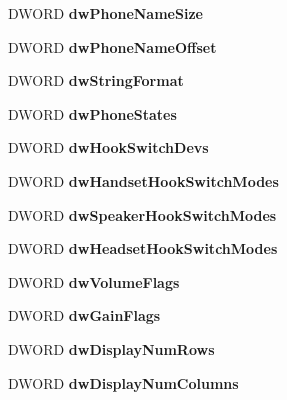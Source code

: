 \begin{DoxyCompactItemize}
D\+W\+O\+RD {\bfseries dw\+Phone\+Name\+Size}
\item 
\mbox{\label{structphonecaps__tag_a3098e0c892d12db66396d76dcca60234}} 
D\+W\+O\+RD {\bfseries dw\+Phone\+Name\+Offset}
\item 
\mbox{\label{structphonecaps__tag_ab76e653cf44c86c24b37ab6d427f272c}} 
D\+W\+O\+RD {\bfseries dw\+String\+Format}
\item 
\mbox{\label{structphonecaps__tag_aebfd889127f74a13ff1640784a7ee8c3}} 
D\+W\+O\+RD {\bfseries dw\+Phone\+States}
\item 
\mbox{\label{structphonecaps__tag_a6e33166733eb756db24edf6845581c49}} 
D\+W\+O\+RD {\bfseries dw\+Hook\+Switch\+Devs}
\item 
\mbox{\label{structphonecaps__tag_ac23ea33c11bc2f5025dc038dd83b935c}} 
D\+W\+O\+RD {\bfseries dw\+Handset\+Hook\+Switch\+Modes}
\item 
\mbox{\label{structphonecaps__tag_a77f38ac79bddf0decfea3761a088e77c}} 
D\+W\+O\+RD {\bfseries dw\+Speaker\+Hook\+Switch\+Modes}
\item 
\mbox{\label{structphonecaps__tag_acd695a4fb5768fae41ba7cf0c49bac0d}} 
D\+W\+O\+RD {\bfseries dw\+Headset\+Hook\+Switch\+Modes}
\item 
\mbox{\label{structphonecaps__tag_a06634c1aecdd8a87cef381d3126900c8}} 
D\+W\+O\+RD {\bfseries dw\+Volume\+Flags}
\item 
\mbox{\label{structphonecaps__tag_a7b82fcd8f37339466aba561659b771ec}} 
D\+W\+O\+RD {\bfseries dw\+Gain\+Flags}
\item 
\mbox{\label{structphonecaps__tag_a23960c70e70565d00e0536f6f9b43bde}} 
D\+W\+O\+RD {\bfseries dw\+Display\+Num\+Rows}
\item 
\mbox{\label{structphonecaps__tag_aeabe706598fb916585fd79fa0b5659b5}} 
D\+W\+O\+RD {\bfseries dw\+Display\+Num\+Columns}

\end{DoxyCompactItemize}
